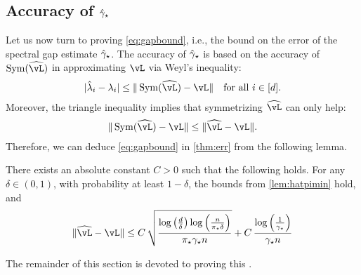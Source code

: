 
\subsection{Accuracy of $\hat\gamma_{\star}$}

Let us now turn to proving \cref{eq:gapbound}, i.e., 
the bound on the error of the spectral gap estimate $\hat\gamma_{\star}$.
The accuracy of $\hat\gamma_{\star}$ is based on the accuracy of $\Sym(\wh\vL)$
in approximating $\vL$ via Weyl's inequality:
\begin{align*}%
  |\hat\lambda_i - \lambda_i|
  \leq \norm{\Sym(\wh\vL) - \vL}
  \quad \text{for all }i \in [d] .
\end{align*}
Moreover, the triangle inequality implies that symmetrizing $\wh\vL$
can only help:
\begin{align*}
  \norm{\Sym(\wh\vL) - \vL} \leq \norm{\wh\vL - \vL} .
\end{align*}
Therefore, we can deduce \cref{eq:gapbound} in \cref{thm:err} from the
following lemma.
\begin{lemma}
  \label{lem:gap}
  There exists an absolute constant $C>0$ such that the following
  holds.
  For any $\delta \in (0,1)$, with probability at least $1-\delta$,
  the bounds from \cref{lem:hatpimin} hold, and
  \begin{equation*}
    \norm{\wh\vL - \vL}
    \leq
    C\,
      \sqrt{
        \frac{
          \log\Parens{\frac{d}{\delta}}
          \log\Parens{\frac{n}{\pimin\delta}}
        }{\pimin\gap n}
      }
      +
      C\,
      \frac{\log\Parens{\frac{1}{\gap}}}{\gap n}
  \end{equation*}
\end{lemma}
The remainder of this section is devoted to proving this
.

